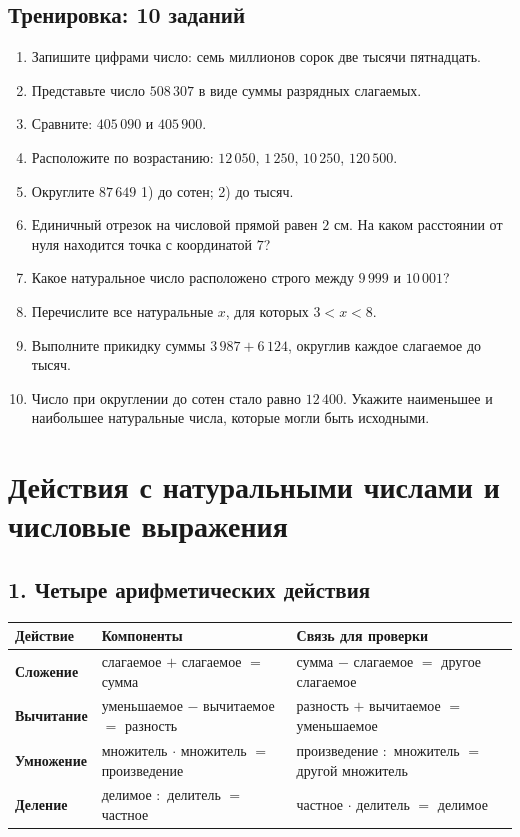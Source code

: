 \documentclass[12pt,a4paper]{article}
\newcommand{\trainingtitle}{\subsection*{Тренировка: 10 заданий}}
\begin{document}
\trainingtitle
\begin{enumerate}
  \item Запишите цифрами число: семь миллионов сорок две тысячи пятнадцать.
  \item Представьте число $508\,307$ в виде суммы разрядных слагаемых.
  \item Сравните: $405\,090$ и $405\,900$.
  \item Расположите по возрастанию: $12\,050$, $1\,250$, $10\,250$, $120\,500$.
  \item Округлите $87\,649$ 1) до сотен; 2) до тысяч.
  \item Единичный отрезок на числовой прямой равен $2$ см. На каком расстоянии от нуля находится точка с координатой $7$?
  \item Какое натуральное число расположено строго между $9\,999$ и $10\,001$?
  \item Перечислите все натуральные $x$, для которых $3<x<8$.
  \item Выполните прикидку суммы $3\,987+6\,124$, округлив каждое слагаемое до тысяч.
  \item Число при округлении до сотен стало равно $12\,400$. Укажите наименьшее и наибольшее натуральные числа, которые могли быть исходными.
\end{enumerate}

\newpage

\section{Действия с натуральными числами и числовые выражения}

\subsection*{1. Четыре арифметических действия}
\begin{center}
\begin{tabularx}{\textwidth}{@{}>{\bfseries}l X X@{}}
\toprule
Действие & Компоненты & Связь для проверки \\
\midrule
Сложение & слагаемое $+$ слагаемое $=$ сумма & сумма $-$ слагаемое $=$ другое слагаемое \\
Вычитание & уменьшаемое $-$ вычитаемое $=$ разность & разность $+$ вычитаемое $=$ уменьшаемое \\
Умножение & множитель $\cdot$ множитель $=$ произведение & произведение $:$ множитель $=$ другой множитель \\
Деление & делимое $:$ делитель $=$ частное & частное $\cdot$ делитель $=$ делимое \\
\bottomrule
\end{tabularx}
\end{center}
\end{document}
